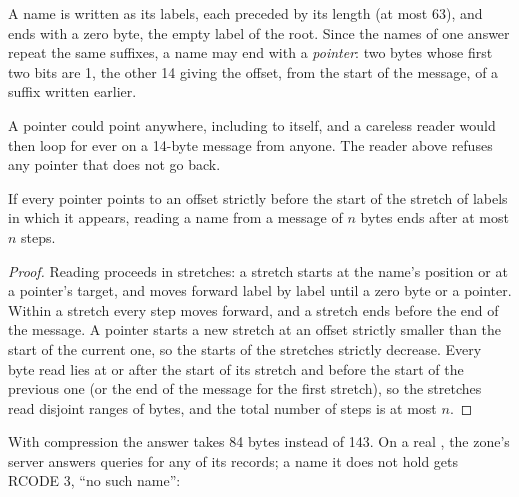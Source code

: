 A name is written as its labels, each preceded by its length (at most 63), and ends with a zero byte, the empty label
of the root. Since the names of one answer repeat the same suffixes, a name may end with a \emph{pointer}: two bytes
whose first two bits are 1, the other 14 giving the offset, from the start of the message, of a suffix written
earlier.

\label{lst:b2:application-layer:encode}

\label{lst:b2:application-layer:read}

A pointer could point anywhere, including to itself, and a careless reader would then loop for ever on a 14-byte
message from anyone. The reader above refuses any pointer that does not go back.

\begin{proposition}\label{prop:b2:application-layer:compression}
If every pointer points to an offset strictly before the start of the stretch of labels in which it appears, reading a
name from a message of $n$ bytes ends after at most $n$ steps.
\end{proposition}

\begin{proof}
Reading proceeds in stretches: a stretch starts at the name's position or at a pointer's target, and moves forward
label by label until a zero byte or a pointer. Within a stretch every step moves forward, and a stretch ends before
the end of the message. A pointer starts a new stretch at an offset strictly smaller than the start of the current
one, so the starts of the stretches strictly decrease. Every byte read lies at or after the start of its stretch and
before the start of the previous one (or the end of the message for the first stretch), so the stretches read
disjoint ranges of bytes, and the total number of steps is at most $n$.
\end{proof}

\label{out:b2:application-layer:message}

With compression the answer takes 84 bytes instead of 143. On a real , the zone's server answers queries for any
of its records; a name it does not hold gets RCODE 3, ``no such name'':

